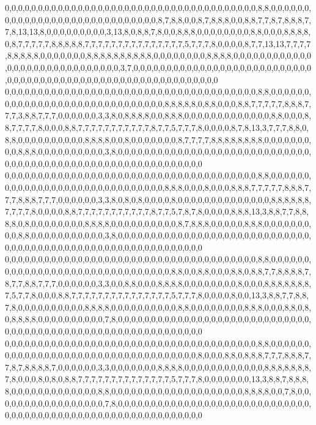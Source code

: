 0,0,0,0,0,0,0,0,0,0,0,0,0,0,0,0,0,0,0,0,0,0,0,0,0,0,0,0,0,0,0,0,0,0,0,0,0,0,8,8,0,0,0,0,0,0,0,0,0,0,0,0,0,0,0,0,0,0,0,0,0,0,0,0,0,0,0,0,0,8,7,8,8,0,0,8,7,8,8,8,0,0,8,8,7,7,8,7,8,8,8,7,7,8,13,13,8,0,0,0,0,0,0,0,0,0,3,13,8,0,8,8,7,8,0,0,8,8,8,0,0,0,0,0,0,0,0,8,8,0,0,0,8,8,8,8,0,8,7,7,7,7,7,8,8,8,8,8,7,7,7,7,7,7,7,7,7,7,7,7,7,7,7,5,7,7,7,8,0,0,0,0,8,7,7,13,13,7,7,7,7,8,8,8,8,8,0,0,0,0,0,0,0,8,8,8,8,8,8,8,8,8,8,0,0,0,0,0,0,0,0,8,8,8,8,0,0,0,0,0,0,0,0,0,0,0,0,0,0,0,0,0,0,0,0,0,0,0,0,0,0,0,0,0,3,7,0,0,0,0,0,0,0,0,0,0,0,0,0,0,0,0,0,0,0,0,0,0,0,0,0,0,0,0,0,0,0,0,0,0,0,0,0,0,0,0,0,0,0,0,0,0,0,0,0,0,0,0,0,0,0,0,0,0,0
0,0,0,0,0,0,0,0,0,0,0,0,0,0,0,0,0,0,0,0,0,0,0,0,0,0,0,0,0,0,0,0,0,0,0,0,0,0,8,8,0,0,0,0,0,0,0,0,0,0,0,0,0,0,0,0,0,0,0,0,0,0,0,0,0,0,0,0,0,0,8,8,8,8,8,0,8,8,0,0,0,8,8,7,7,7,7,7,8,8,8,7,7,7,3,8,8,7,7,7,0,0,0,0,0,0,3,3,8,0,8,8,8,8,0,0,8,8,8,0,0,0,0,0,0,0,0,0,0,0,0,0,8,8,0,0,0,8,8,7,7,7,7,8,0,0,0,8,8,7,7,7,7,7,7,7,7,7,7,7,8,7,7,5,7,7,7,8,0,0,0,0,8,7,8,13,3,7,7,7,8,8,0,8,8,0,0,0,0,0,0,0,0,0,0,8,8,8,8,0,0,8,0,0,0,0,0,0,0,8,7,7,7,7,8,8,8,8,8,8,8,8,0,0,0,0,0,0,0,0,0,8,8,8,0,0,0,0,0,0,0,0,0,0,3,8,0,0,0,0,0,0,0,0,0,0,0,0,0,0,0,0,0,0,0,0,0,0,0,0,0,0,0,0,0,0,0,0,0,0,0,0,0,0,0,0,0,0,0,0,0,0,0,0,0,0,0,0,0,0,0,0,0,0,0
0,0,0,0,0,0,0,0,0,0,0,0,0,0,0,0,0,0,0,0,0,0,0,0,0,0,0,0,0,0,0,0,0,0,0,0,0,0,8,8,0,0,0,0,0,0,0,0,0,0,0,0,0,0,0,0,0,0,0,0,0,0,0,0,0,0,0,0,0,0,8,8,8,0,0,0,8,0,0,0,8,8,8,7,7,7,7,7,8,8,8,7,7,7,8,8,8,7,7,7,0,0,0,0,0,0,3,3,8,0,8,0,8,0,0,0,0,8,0,0,0,0,0,0,0,0,0,0,0,0,0,0,8,8,8,8,8,8,7,7,7,7,8,0,0,0,0,8,8,7,7,7,7,7,7,7,7,7,7,7,8,7,7,5,7,8,7,8,0,0,0,0,8,8,8,13,3,8,8,7,7,8,8,8,8,0,8,0,0,0,0,0,0,0,0,8,8,8,8,0,0,0,0,0,0,0,0,0,0,8,7,8,8,8,0,0,0,0,0,8,8,8,0,0,0,0,0,0,0,0,0,8,8,0,0,0,0,0,0,0,0,0,0,0,3,8,0,0,0,0,0,0,0,0,0,0,0,0,0,0,0,0,0,0,0,0,0,0,0,0,0,0,0,0,0,0,0,0,0,0,0,0,0,0,0,0,0,0,0,0,0,0,0,0,0,0,0,0,0,0,0,0,0,0,0
0,0,0,0,0,0,0,0,0,0,0,0,0,0,0,0,0,0,0,0,0,0,0,0,0,0,0,0,0,0,0,0,0,0,0,0,0,0,8,8,0,0,0,0,0,0,0,0,0,0,0,0,0,0,0,0,0,0,0,0,0,0,0,0,0,0,0,0,0,0,0,8,8,0,0,8,8,0,0,0,8,8,0,8,8,7,7,8,8,8,8,7,8,7,7,8,8,7,7,7,0,0,0,0,0,0,3,3,0,0,8,8,0,0,0,8,8,8,8,0,0,0,0,0,0,0,0,8,0,0,0,8,8,8,8,8,8,8,7,5,7,7,8,0,0,0,8,8,7,7,7,7,7,7,7,7,7,7,7,7,7,7,7,5,7,7,7,8,0,0,0,0,8,0,0,13,3,8,8,7,7,8,8,7,8,0,0,0,0,0,0,0,0,0,0,8,8,8,8,0,0,0,0,0,0,0,0,0,0,8,8,0,0,0,0,0,0,0,0,8,8,8,0,0,0,8,8,0,8,0,8,8,8,8,0,0,0,0,0,0,0,0,0,0,7,8,0,0,0,0,0,0,0,0,0,0,0,0,0,0,0,0,0,0,0,0,0,0,0,0,0,0,0,0,0,0,0,0,0,0,0,0,0,0,0,0,0,0,0,0,0,0,0,0,0,0,0,0,0,0,0,0,0,0,0
0,0,0,0,0,0,0,0,0,0,0,0,0,0,0,0,0,0,0,0,0,0,0,0,0,0,0,0,0,0,0,0,0,0,0,0,0,0,8,8,0,0,0,0,0,0,0,0,0,0,0,0,0,0,0,0,0,0,0,0,0,0,0,0,0,0,0,0,0,0,0,0,0,0,0,8,0,0,0,8,8,0,8,8,8,7,7,7,8,8,8,7,7,8,7,8,8,8,8,7,0,0,0,0,0,0,3,3,0,0,0,0,0,0,0,8,8,8,8,0,0,0,0,0,0,0,0,0,0,0,0,8,8,8,8,8,8,8,7,8,0,0,0,8,0,8,0,8,8,7,7,7,7,7,7,7,7,7,7,7,7,7,7,5,7,7,7,8,0,0,0,0,0,0,0,13,3,8,8,7,8,8,8,8,0,0,0,0,0,0,0,0,0,0,0,0,0,8,8,0,0,0,0,0,0,0,0,0,0,0,0,0,0,0,0,0,0,0,0,8,8,8,8,0,0,7,8,0,0,0,0,0,0,0,0,0,0,0,0,0,0,0,0,0,7,8,0,0,0,0,0,0,0,0,0,0,0,0,0,0,0,0,0,0,0,0,0,0,0,0,0,0,0,0,0,0,0,0,0,0,0,0,0,0,0,0,0,0,0,0,0,0,0,0,0,0,0,0,0,0,0,0,0,0,0
